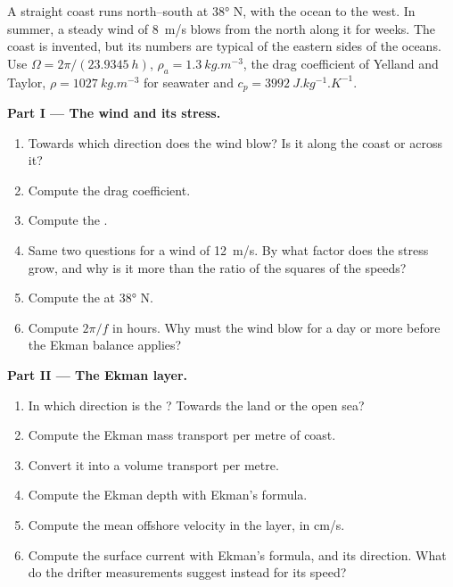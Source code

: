 \begin{problem}
\label{pb:b1:ocean-circulation:1}
A straight coast runs north--south at \ang{38} N, with the ocean to the west. In
summer, a steady wind of \qty{8}{m/s} blows from the north along it for weeks. The
coast is invented, but its numbers are typical of the eastern sides of the oceans.
Use $\Omega = 2\pi/(\qty{23.9345}{h})$, $\rho_a = \qty{1.3}{kg.m^{-3}}$, the drag
coefficient of Yelland and Taylor, $\rho = \qty{1027}{kg.m^{-3}}$ for seawater and
$c_p = \qty{3992}{J.kg^{-1}.K^{-1}}$.

\medskip
\noindent\textbf{Part I --- The wind and its stress.}
\begin{enumerate}
  \item Towards which direction does the wind blow? Is it along the coast or across
        it?
  \item Compute the drag coefficient.
  \item Compute the .
  \item Same two questions for a wind of \qty{12}{m/s}. By what factor does the
        stress grow, and why is it more than the ratio of the squares of the speeds?
  \item Compute the  at \ang{38} N.
  \item Compute $2\pi/f$ in hours. Why must the wind blow for a day or more before
        the Ekman balance applies?
\end{enumerate}

\medskip
\noindent\textbf{Part II --- The Ekman layer.}
\begin{enumerate}[resume]
  \item In which direction is the ? Towards the land or the open sea?
  \item Compute the Ekman mass transport per metre of coast.
  \item Convert it into a volume transport per metre.
  \item Compute the Ekman depth with Ekman's formula.
  \item Compute the mean offshore velocity in the layer, in \unit{cm/s}.
  \item Compute the surface current with Ekman's formula, and its direction. What
        do the drifter measurements suggest instead for its speed?
\end{enumerate}


\end{problem}

